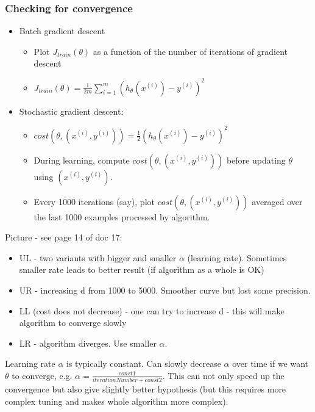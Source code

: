 \documentclass{scrartcl}
\begin{document}
\subsubsection{Checking for convergence}
\begin{itemize}
\item Batch gradient descent
  \begin{itemize}
  \item Plot $J_{train}(\theta)$ as a function of the number of
    iterations of gradient descent
  \item $J_{train}(\theta) = \frac{1}{2m} \sum \limits_{i=1}^m
    (h_\theta(x^{(i)}) - y^{(i)})^2$
  \end{itemize}
\item Stochastic gradient descent:
  \begin{itemize}
  \item $cost(\theta, (x^{(i)}, y^{(i)})) =
    \frac{1}{2}(h_\theta(x^{(i)}) - y^{(i)})^2$
  \item During learning, compute $cost(\theta, (x^{(i)}, y^{(i)}))$
    before updating $\theta$ using $(x^{(i)},y^{(i)})$.
  \item Every 1000 iterations (say), plot $cost(\theta, (x^{(i)},
    y^{(i)}))$ averaged over the last 1000 examples processed by
    algorithm.
  \end{itemize}
\end{itemize}

Picture - see page 14 of doc 17:
\begin{itemize}
\item UL - two variants with bigger and smaller $\alpha$ (learning
  rate). Sometimes smaller rate leads to better result (if algorithm
  as a whole is OK)
\item UR - increasing d from 1000 to 5000. Smoother curve but lost
  some precision.
\item LL (cost does not decrease) - one can try to increase d - this
  will make algorithm to converge slowly
\item LR - algorithm diverges. Use smaller $\alpha$.
\end{itemize}

Learning rate $\alpha$ is typically constant. Can slowly decrease
$\alpha$ over time if we want $\theta$ to converge, e.g. $\alpha =
\frac{const1}{iterationNumber + const2}$. This can not only speed up
the convergence but also give slightly better hypothesis (but this
requires more complex tuning and makes whole algorithm more complex).
\end{document}
